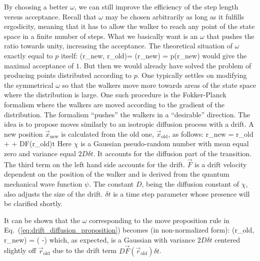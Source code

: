 By choosing a better $\omega$, we can still improve the efficiency of
the step length versus acceptance. Recall that $\omega$ may be chosen
arbitrarily as long as it fulfills ergodicity, meaning that it has to
allow the walker to reach any point of the state space in a finite
number of steps. What we basically want is an $\omega$ that pushes the
ratio towards unity,
increasing the acceptance. The theoretical situation of $\omega$
exactly equal to $p$ itself:
\bdm
\omega(\vec r_\textrm{new}\textrm{, }\vec r_\textrm{old})=
\omega(\vec r_\textrm{new}) = p(\vec r_\textrm{new})
\edm
would give the maximal acceptance of $1$. But then we would already
have solved the problem of producing points distributed according to
$p$. One typically settles on modifying the symmetrical $\omega$ so
that the walkers move more towards areas of the state space where the
distribution is large. One such procedure is the Fokker-Planck
formalism where the walkers are moved according to
the gradient of the distribution. The formalism ``pushes'' the walkers
in a ``desirable'' direction. The idea is to propose moves similarly
to an isotropic diffusion process with a drift. A new position $\vec
x_\textrm{new}$ is calculated from the old one, $\vec x_\textrm{old}$,
as follows:
\be
\vec r_\textrm{new} = \vec r_\textrm{old} + \chi +
D\vec F(\vec r_\textrm{old})\delta t
\label{eq:drift_diffusion_proposition}
\ee
Here $\chi$ is a Gaussian pseudo-random number with mean equal zero
and variance equal $2D\delta t$. It accounts for the diffusion part of
the transition. The third term on the left hand side accounts for the
drift. $\vec F$ is a drift velocity dependent on the position of the
walker and is derived from the quantum mechanical wave function
$\psi$. The constant $D$, being the diffusion constant of $\chi$, also
adjusts the size of the drift. $\delta t$ is a time step parameter
whose presence will be clarified shortly.

It can be shown that the $\omega$ corresponding to
the move proposition rule in Eq.~(\ref{eq:drift_diffusion_proposition})
becomes (in non-normalized form):
\be
\omega(\vec r_\textrm{old}\textrm{, }\vec r_\textrm{new}) =
\exp\left(
-\right)
\label{eq:omega_drift_diffusion}
\ee
which, as expected, is a Gaussian with variance $2D\delta t$ centered
slightly off $\vec r_\textrm{old}$ due to the drift term $D\vec F(\vec
r_\textrm{old})\delta t$.


